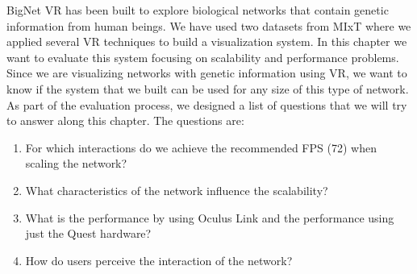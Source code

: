 


BigNet VR has been built to explore biological networks that contain genetic information from human beings. We have used two datasets from MIxT where we applied several VR techniques to build a visualization system. In this chapter we want to evaluate this system focusing on scalability and performance problems. Since we are visualizing networks with genetic information using VR, we want to know if the system that we built can be used for any size of this type of network. As part of the evaluation process, we designed a list of questions that we will try to answer along this chapter. The questions are:
\begin{enumerate}
  \item For which interactions do we achieve the recommended FPS (72) when scaling the network?
  \item What characteristics of the network influence the scalability?
  \item What is the performance by using Oculus Link and the performance using just the Quest hardware?
  \item How do users perceive the interaction of the network?
\end{enumerate}

